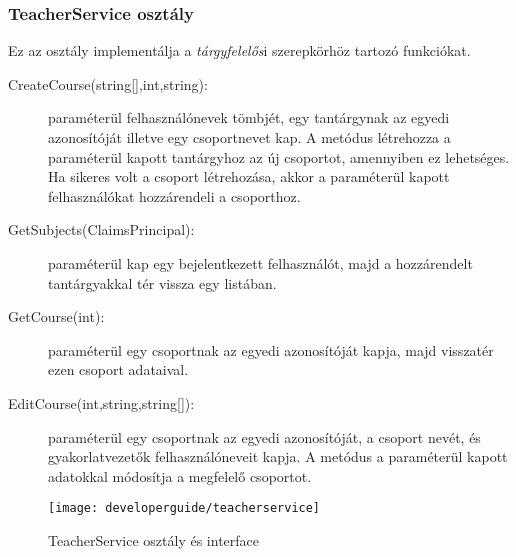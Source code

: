 \subsubsection{TeacherService osztály}
Ez az osztály implementálja a \emph{tárgyfelelős}i szerepkörhöz tartozó funkciókat.
\begin{description}
	\item[CreateCourse(string{[]},int,string):] paraméterül felhasználónevek tömbjét, egy tantárgynak az egyedi azonosítóját illetve egy csoportnevet kap. A metódus létrehozza a paraméterül kapott tantárgyhoz az új csoportot, amennyiben ez lehetséges. Ha sikeres volt a csoport létrehozása, akkor a paraméterül kapott felhasználókat hozzárendeli a csoporthoz.
	\item[GetSubjects(ClaimsPrincipal):] paraméterül kap egy bejelentkezett felhasználót, majd a hozzárendelt tantárgyakkal tér vissza egy listában.
	\item[GetCourse(int):] paraméterül egy csoportnak az egyedi azonosítóját kapja, majd visszatér ezen csoport adataival.
	\item[EditCourse(int,string,string{[]}):] paraméterül egy csoportnak az egyedi azonosítóját, a csoport nevét, és gyakorlatvezetők felhasználóneveit kapja. A metódus a paraméterül kapott adatokkal módosítja a megfelelő csoportot. 
\end{description}
\begin{figure}[H]
	\centering
	\texttt{[image: developerguide/teacherservice]}
	\caption{TeacherService osztály és interface}
	\label{fig:bll-teacherservice}
\end{figure}
